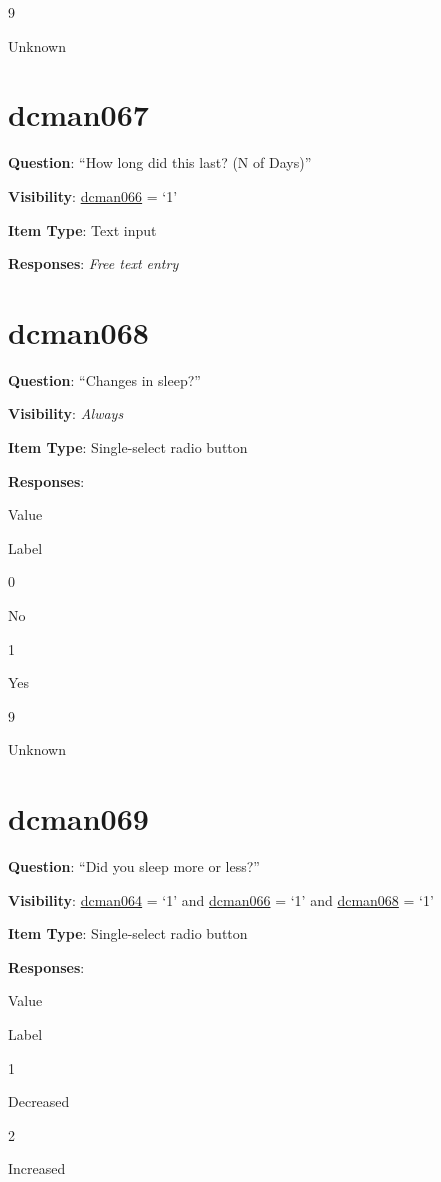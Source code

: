 \documentclass[]{book}
\begin{document}
9

Unknown

\hypertarget{dcman067}{%
\section{dcman067}\label{dcman067}}

\textbf{Question}: ``How long did this last? (N of Days)''

\textbf{Visibility}: \protect\hyperlink{dcman066}{dcman066} = `1'

\textbf{Item Type}: Text input

\textbf{Responses}: \emph{Free text entry}

\hypertarget{dcman068}{%
\section{dcman068}\label{dcman068}}

\textbf{Question}: ``Changes in sleep?''

\textbf{Visibility}: \emph{Always}

\textbf{Item Type}: Single-select radio button

\textbf{Responses}:

Value

Label

0

No

1

Yes

9

Unknown

\hypertarget{dcman069}{%
\section{dcman069}\label{dcman069}}

\textbf{Question}: ``Did you sleep more or less?''

\textbf{Visibility}: \protect\hyperlink{dcman064}{dcman064} = `1' and \protect\hyperlink{dcman066}{dcman066} = `1' and \protect\hyperlink{dcman068}{dcman068} = `1'

\textbf{Item Type}: Single-select radio button

\textbf{Responses}:

Value

Label

1

Decreased

2

Increased
\end{document}
